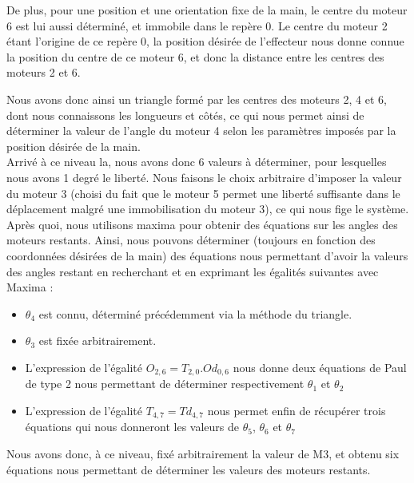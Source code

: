 De plus, pour une position et une orientation fixe de la main, le centre du moteur 6 est lui aussi déterminé, et immobile dans le repère 0. Le centre du moteur 2 étant l'origine de ce repère 0, la position désirée de l'effecteur nous donne connue la position du centre de ce moteur 6, et donc la distance entre les centres des moteurs 2 et 6.
\newpage

Nous avons donc ainsi un triangle formé par les centres des moteurs 2, 4 et 6, dont nous connaissons les longueurs et côtés, ce qui nous permet ainsi de déterminer la valeur de l'angle du moteur 4 selon les paramètres imposés par la position désirée de la main.\\

Arrivé à ce niveau la, nous avons donc 6 valeurs à déterminer, pour lesquelles nous avons 1 degré le liberté. Nous faisons le choix arbitraire d'imposer la valeur du moteur 3 (choisi du fait que le moteur 5 permet une liberté suffisante dans le déplacement malgré une immobilisation du moteur 3), ce qui nous fige le système.\\

Après quoi, nous utilisons maxima pour obtenir des équations sur les angles des moteurs restants. Ainsi, nous pouvons déterminer (toujours en fonction des coordonnées désirées de la main) des équations nous permettant d'avoir la valeurs des angles restant en recherchant et en exprimant les égalités suivantes avec Maxima :\\

\begin{itemize}
\item $\theta_4$ est connu, déterminé précédemment via la méthode du triangle.
\item $\theta_3$ est fixée arbitrairement.
\item L'expression de l'égalité $O_{2, 6} = T_{2, 0} . Od_{0, 6}$ nous donne deux équations de Paul de type 2 nous permettant de déterminer respectivement $\theta_1$ et  $\theta_2$
\item L'expression de l'égalité $T_{4, 7} = Td_{4, 7}$ nous permet enfin de récupérer trois équations qui nous donneront les valeurs de $\theta_5$, $\theta_6$ et $\theta_7$\\

\end{itemize}

Nous avons donc, à ce niveau, fixé arbitrairement la valeur de M3, et obtenu six équations nous permettant de déterminer les valeurs des moteurs restants.

